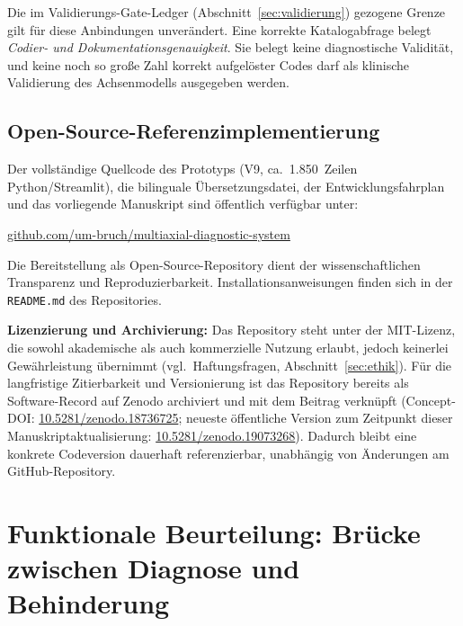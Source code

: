 \documentclass[11pt,a4paper]{article}
\begin{document}
Die im Validierungs-Gate-Ledger (Abschnitt~\ref{sec:validierung}) gezogene Grenze gilt für diese Anbindungen unverändert. Eine korrekte Katalogabfrage belegt \emph{Codier- und Dokumentationsgenauigkeit}. Sie belegt keine diagnostische Validität, und keine noch so große Zahl korrekt aufgelöster Codes darf als klinische Validierung des Achsenmodells ausgegeben werden.

\subsection{Open-Source-Referenzimplementierung}

Der vollst\"andige Quellcode des Prototyps (V9, ca.\ 1.850~Zeilen Python/Streamlit), die bilinguale \"Ubersetzungsdatei, der Entwicklungsfahrplan und das vorliegende Manuskript sind \"offentlich verf\"ugbar unter:

\begin{center}
\href{https://github.com/um-bruch/multiaxial-diagnostic-system}{github.com/um-bruch/multiaxial-diagnostic-system}
\end{center}

\noindent Die Bereitstellung als Open-Source-Repository dient der wissenschaftlichen Transparenz und Reproduzierbarkeit. Installationsanweisungen finden sich in der \texttt{README.md} des Repositories.

\textbf{Lizenzierung und Archivierung:} Das Repository steht unter der MIT-Lizenz, die sowohl akademische als auch kommerzielle Nutzung erlaubt, jedoch keinerlei Gew\"ahrleistung \"ubernimmt (vgl.\ Haftungsfragen, Abschnitt~\ref{sec:ethik}). F\"ur die langfristige Zitierbarkeit und Versionierung ist das Repository bereits als Software-Record auf Zenodo archiviert und mit dem Beitrag verkn\"upft (Concept-DOI: \href{https://doi.org/10.5281/zenodo.18736725}{10.5281/zenodo.18736725}; neueste \"offentliche Version zum Zeitpunkt dieser Manuskriptaktualisierung: \href{https://doi.org/10.5281/zenodo.19073268}{10.5281/zenodo.19073268}). Dadurch bleibt eine konkrete Codeversion dauerhaft referenzierbar, unabh\"angig von \"Anderungen am GitHub-Repository.


\section{Funktionale Beurteilung: Br\"ucke zwischen Diagnose und Behinderung}
\label{sec:funktional}
\end{document}
